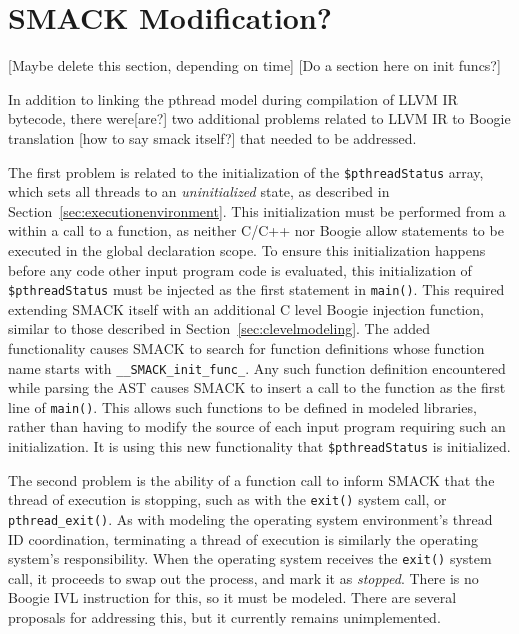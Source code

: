 \section{SMACK Modification?}
[Maybe delete this section, depending on time]
[Do a section here on init funcs?]

In addition to linking the pthread model during compilation of LLVM IR
bytecode, there were[are?] two additional problems related to LLVM IR
to Boogie translation [how to say smack itself?] that needed to be
addressed.

The first problem is related to the initialization of the
\lstinline|$pthreadStatus| array, which sets all threads to an
\emph{uninitialized} state, as described in
Section~\ref{sec:executionenvironment}.  This initialization must
be performed from a within a call to a function, as neither C/C++ nor
Boogie allow statements to be executed in the global declaration
scope.  To ensure this initialization happens before any code other
input program code is evaluated, this initialization of
\lstinline|$pthreadStatus| must be injected as the first statement in
\lstinline|main()|.  This required extending SMACK itself with an
additional C level Boogie injection function, similar to those
described in Section~\ref{sec:clevelmodeling}.  The added functionality
causes SMACK to search for function definitions whose function name
starts with \lstinline|__SMACK_init_func_|.  Any such function
definition encountered while parsing the AST causes SMACK to insert a
call to the function as the first line of \lstinline|main()|.  This
allows such functions to be defined in modeled libraries, rather than
having to modify the source of each input program requiring such an
initialization.  It is using this new functionality that
\lstinline|$pthreadStatus| is initialized. 

The second problem is the ability of a function call to inform SMACK
that the thread of execution is stopping, such as with the
\lstinline|exit()| system call, or \lstinline|pthread_exit()|.  As
with modeling the operating system environment's thread ID coordination,
terminating a thread of execution is similarly the operating system's
responsibility.  When the operating system receives the
\lstinline|exit()| system call, it proceeds to swap out the process,
and mark it as \emph{stopped}.  There is no Boogie IVL instruction for
this, so it must be modeled.  There are several proposals for
addressing this, but it currently remains unimplemented.

